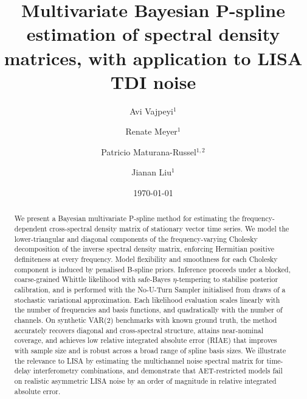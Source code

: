 \documentclass[%
	reprint,
	nofootinbib,
	amsmath,
	amssymb,
	aps,
]{revtex4-2}
\begin{document}

	\title{Multivariate Bayesian P-spline estimation of spectral density matrices,
		with application to LISA TDI noise}

    \author{Avi Vajpeyi$^{1}$}
    \author{Renate Meyer$^{1}$}
    \author{Patricio Maturana-Russel$^{1,2}$}
    \author{Jianan Liu$^{1}$}
    

	\date{\today}

	\begin{abstract}
		We present a Bayesian multivariate P-spline method for estimating the
		frequency-dependent cross-spectral density matrix of stationary vector time
		series. We model the lower-triangular and diagonal components of the
		frequency-varying Cholesky decomposition of the inverse spectral density
		matrix, enforcing Hermitian positive definiteness at every frequency.
		Model flexibility and smoothness for each Cholesky component is induced
		by penalised B-spline priors.
		Inference proceeds under a blocked, coarse-grained Whittle likelihood
		with safe-Bayes $\eta$-tempering to stabilise posterior calibration, and
		is performed with the No-U-Turn Sampler initialised from draws of a
		stochastic variational approximation. Each likelihood evaluation
		scales linearly with the number of frequencies and basis functions,
		and quadratically with the number of channels. On synthetic VAR(2)
		benchmarks with known ground truth, the method accurately recovers
		diagonal and cross-spectral structure, attains near-nominal coverage, and
		achieves low relative integrated absolute error (RIAE) that improves with
		sample size and is robust across a broad range of spline basis sizes. We
		illustrate the relevance to LISA by estimating the multichannel noise
		spectral matrix for time-delay interferometry combinations, and
		demonstrate that AET-restricted models fail on realistic asymmetric
		LISA noise by an order of magnitude in relative integrated absolute
		error.
	\end{abstract}


	\maketitle
\end{document}

